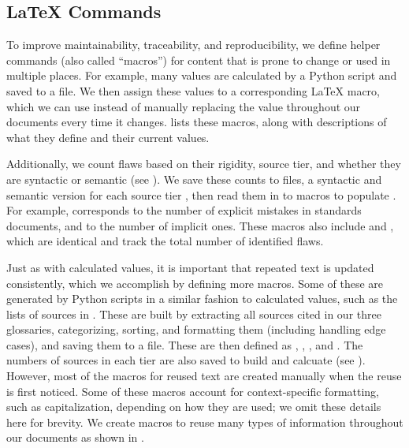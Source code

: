 \subsection[LaTeX Commands]{\LaTeX{} Commands}\label{macros}
To improve maintainability, traceability, and reproducibility, we define
helper commands (also called ``macros'') for content that is prone to change
or used in multiple places. For example, many values are calculated by a Python
script and saved to a file. We then assign these values to a corresponding
\LaTeX{} macro, which we can use instead of manually replacing the value
throughout our documents every time it changes.  lists
these macros, along with descriptions of what they define and their current
values.



\label{flawCounts}
Additionally, we count flaws based on their rigidity, source tier,
and whether they are syntactic or semantic (see
).
We save these counts to files, a syntactic and semantic version for each
source tier%
, then read them in to macros
to populate . For example,
 corresponds to the number of explicit mistakes in
standards documents, and  to the number of implicit
ones. These macros also include  and \newline
{}, which are identical and
track the total number of identified flaws.

\label{text-macros}
Just as with calculated values, it is important that repeated text is updated
consistently, which we accomplish by defining more macros. Some of these are
generated by Python scripts in a similar fashion to calculated values, such as
the lists of sources in . These are built by extracting all
sources cited in our three glossaries, categorizing, sorting, and formatting
them (including handling edge cases), and saving them to a file. These are then
defined as , , , and
.
The numbers of sources in each tier are also saved to build 
and calcuate  (see ). However, most of the
macros for reused text are created manually when the reuse is first noticed.
Some of these macros account for context-specific formatting, such as
capitalization, depending on how they are used; we omit these details here for
brevity. We create macros to reuse many types of information throughout our
documents as shown in .

